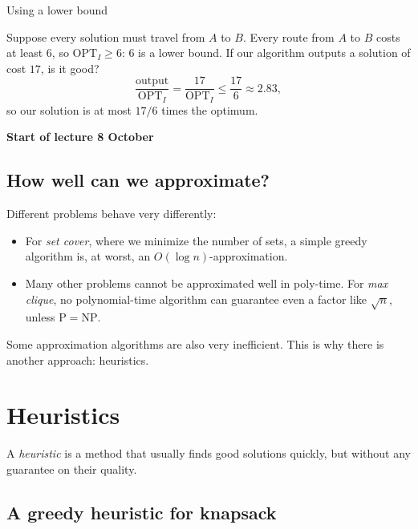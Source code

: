 \documentclass[a4paper,12pt,oneside]{report}
\newcommand{\OPT}{\mathrm{OPT}}
\newcommand{\lecturebanner}[1]{%
  \Needspace{6\baselineskip}%
  \begin{tcolorbox}[colback=yellow!20,colframe=yellow!60!black,
    boxrule=0.4pt,arc=1mm,left=5pt,right=5pt,top=3pt,bottom=3pt,
    before skip=6pt,after skip=6pt]
  \small\textbf{#1}
  \end{tcolorbox}}
\newcommand{\lecturestart}[1]{\lecturebanner{Start of lecture #1}}
\begin{document}
\begin{framedexample}{Using a lower bound}\label{ex:lower-bound-ratio}
\begin{center}
\end{center}
Suppose every solution must travel from $A$ to $B$. Every route from
$A$ to $B$ costs at least $6$, so $\OPT_I\geq6$: $6$ is a lower bound.
If our algorithm outputs a solution of cost $17$, is it good?
\[
  \frac{\text{output}}{\OPT_I}=\frac{17}{\OPT_I}\leq\frac{17}{6}
  \approx2.83,
\]
so our solution is at most $17/6$ times the optimum.
\end{framedexample}

\lecturestart{8 October}

\subsection{How well can we approximate?}

Different problems behave very differently:
\begin{itemize}
  \item For \emph{set cover}, where we minimize the number of sets, a
    simple greedy algorithm is, at worst, an $O(\log n)$-approximation.
  \item Many other problems cannot be approximated well in poly-time.
    For \emph{max clique}, no polynomial-time algorithm can guarantee
    even a factor like $\sqrt n$, unless $\mathrm{P}=\mathrm{NP}$.
\end{itemize}
Some approximation algorithms are also very inefficient. This is why
there is another approach: heuristics.

\section{Heuristics}

A \emph{heuristic} is a method that usually finds good solutions
quickly, but without any guarantee on their quality.

\subsection{A greedy heuristic for knapsack}
\end{document}

